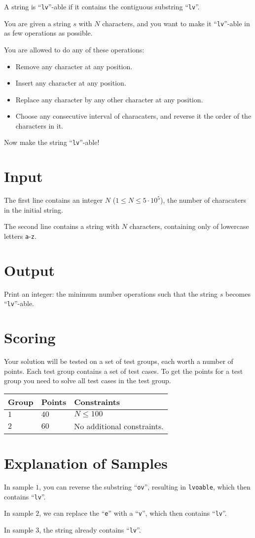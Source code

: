 \noindent
A string is ``\texttt{lv}''-able if it contains the contiguous substring ``\texttt{lv}''.

You are given a string $s$ with $N$ characters, and you want to make it ``\texttt{lv}''-able in as few operations as possible.

You are allowed to do any of these operations:
\begin{itemize}
  \item Remove any character at any position.
  \item Insert any character at any position.
  \item Replace any character by any other character at any position.
  \item Choose any consecutive interval of characaters, and reverse it the order of the characters in it.
\end{itemize}

Now make the string ``\texttt{lv}''-able!

\section*{Input}
The first line contains an integer $N$ ($1 \leq N \leq 5 \cdot 10^5$), the number of characaters in the initial string.

The second line contains a string with $N$ characters, containing only of lowercase letters \texttt{a}-\texttt{z}.

\section*{Output}
Print an integer: the minimum number operations such that the string $s$ becomes ``\texttt{lv}''-able.

\section*{Scoring}
Your solution will be tested on a set of test groups, each worth a number of points. Each test group contains
a set of test cases. To get the points for a test group you need to solve all test cases in the test group.

\noindent
\begin{tabular}{| l | l | p{12cm} |}
  \hline
  \textbf{Group} & \textbf{Points} & \textbf{Constraints} \\ \hline
  $1$    & $40$       & $N \leq 100$ \\ \hline
  $2$    & $60$       & No additional constraints. \\ \hline
\end{tabular}

\section*{Explanation of Samples}
In sample $1$, you can reverse the substring ``\texttt{ov}'', resulting in \texttt{lvoable}, which then contains
``\texttt{lv}''.

In sample $2$, we can replace the ``\texttt{e}'' with a ``\texttt{v}'', which then contains ``\texttt{lv}''.

In sample $3$, the string already contains ``\texttt{lv}''.
